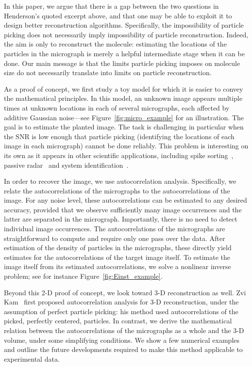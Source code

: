 \documentclass[9pt,twocolumn,twoside,lineno]{pnas-new}
\begin{document}
In this paper, we argue that there is a gap between the two questions in Henderson's quoted excerpt above, and that one may be able to exploit it to design better reconstruction algorithms.
Specifically, the impossibility of particle picking does not necessarily imply impossibility of particle reconstruction.
Indeed, the aim is only to reconstruct the molecule: estimating the locations of the particles in the micrograph is merely a helpful intermediate stage when it can be done. Our main message is that the limits particle picking imposes on molecule size do not necessarily  translate into limits on particle reconstruction.

As a proof of concept, we first study a toy model  for which it is easier to convey the mathematical principles. 
In this model, an unknown image appears multiple times at unknown locations in each of several micrographs, each affected by additive Gaussian noise---see Figure~\ref{fig:micro_example} for an illustration.
The goal is to estimate the planted image. The task is challenging in particular when the SNR is low enough that particle picking (identifying the locations of each image in each micrograph) cannot be done reliably. 
This problem is interesting on its own as it appears in other scientific applications, including spike sorting~\cite{lewicki1998review}, passive radar~\cite{gogineni2017passive} and system identification~\cite{ljung1998system}.
 
In order to recover the image, we use autocorrelation analysis. Specifically, we relate the autocorrelations of the micrographs to the autocorrelations of the image.
For any noise level, these autocorrelations can be estimated to any desired accuracy, provided that we  observe sufficiently many image occurrences and the latter are separated in the micrograph. Importantly, there is no need to detect individual image occurrences. The autocorrelations of the micrographs are straightforward to compute and require only one pass over the data. After estimation of the density of particles in the micrographs, these directly yield estimates for the autocorrelations of the target image itself. To estimate the image itself from its estimated autocorrelations, we solve a nonlinear inverse problem; see for instance Figure~\ref{fig:Einst_example}.

Beyond this 2-D proof of concept, we look toward \mbox{3-D} reconstruction as well. Zvi Kam~\cite{kam1980reconstruction} first proposed autocorrelation analysis for \mbox{3-D} reconstruction, under the assumption of perfect particle picking: his method used autocorrelations of the picked, perfectly centered, particles. In contrast, we derive the mathematical relation between the autocorrelations of the micrographs as a whole and the \mbox{3-D} volume, under some simplifying conditions.
We show a few numerical examples and outline the future developments required to make this method applicable to experimental  data. 
\end{document}
